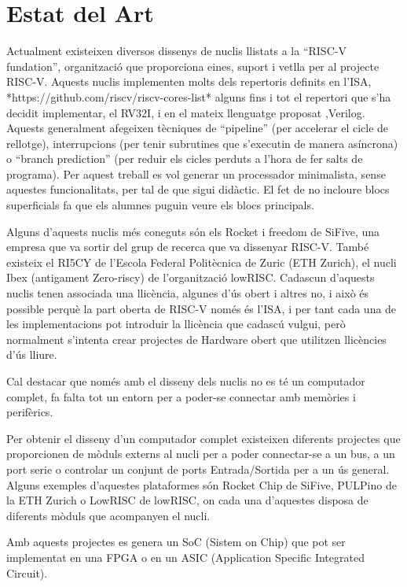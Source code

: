 \documentclass[10pt,a4paper,twocolumn,twoside]{article}
\begin{document}
\section{Estat del Art}
Actualment existeixen diversos dissenys de nuclis llistats a la ``RISC-V fundation'', organització que proporciona eines, suport i vetlla per al projecte RISC-V. Aquests nuclis implementen molts dels repertoris definits en l'ISA, *https://github.com/riscv/riscv-cores-list* alguns fins i tot el repertori que s'ha decidit implementar, el RV32I, i en el mateix llenguatge proposat ,Verilog. Aquests generalment afegeixen tècniques de ``pipeline'' (per accelerar el cicle de rellotge), interrupcions (per tenir subrutines que s'executin de manera asíncrona) o ``branch prediction'' (per reduir els cicles perduts a l'hora de fer salts de programa). 
Per aquest treball es vol generar un processador minimalista, sense aquestes funcionalitats, per tal de que sigui didàctic. 
El fet de no incloure blocs superficials fa que els alumnes puguin veure els blocs principals. 

Alguns d'aquests nuclis més coneguts són els Rocket i freedom de SiFive, una empresa que va sortir del grup de recerca que va dissenyar RISC-V. També existeix el RI5CY de l'Escola Federal Politècnica de Zuric (ETH Zurich), el nucli Ibex (antigament Zero-riscy) de l'organització lowRISC.
Cadascun d'aquests nuclis tenen associada una llicència, algunes d'ús obert i altres no, i això és possible perquè la part oberta de RISC-V només és l'ISA, i per tant cada una de les implementacions pot introduir la llicència que cadascú vulgui, però normalment s'intenta crear projectes de Hardware obert que utilitzen llicències d'ús lliure.

Cal destacar que només amb el disseny dels nuclis no es té un computador complet, fa falta tot un entorn per a poder-se connectar amb memòries i perifèrics. 

Per obtenir el disseny d'un computador complet existeixen diferents projectes que proporcionen de mòduls externs al nucli per a poder connectar-se a un bus, a un port serie o controlar un conjunt de ports Entrada/Sortida per a un ús general. Alguns exemples d'aquestes plataformes són Rocket Chip de SiFive, PULPino de la ETH Zurich o LowRISC de lowRISC, on cada una d'aquestes disposa de diferents mòduls que acompanyen el nucli.

Amb aquests projectes es genera un SoC (Sistem on Chip) que pot ser implementat en una FPGA o en un ASIC (Application Specific Integrated Circuit).
\end{document}
